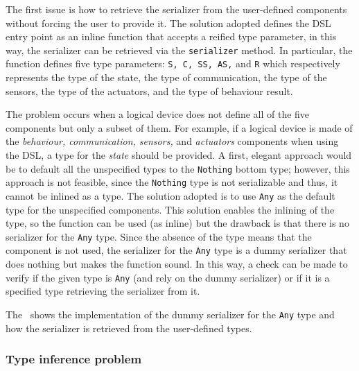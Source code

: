 The first issue is how to retrieve the serializer from the user-defined components without forcing the user to provide it. The solution adopted
defines the DSL entry point as an inline function that accepts a reified type parameter, in this way, the serializer can be retrieved via the
\texttt{serializer} method. In particular, the function defines five type parameters: \texttt{S, C, SS, AS,} and \texttt{R} which respectively
represents the type of the state, the type of communication, the type of the sensors, the type of the actuators, and the type of behaviour result.

The problem occurs when a logical device does not define all of the five components but only a subset of them.
For example, if a logical device is made of the \emph{behaviour, communication, sensors,} and \emph{actuators} components when using the DSL, a type
for the \emph{state} should be provided. A first, elegant approach would be to default all the unspecified types to the \texttt{Nothing} bottom type;
however, this approach is not feasible, since the \texttt{Nothing} type is not serializable and thus, it cannot be inlined as a type.
The solution adopted is to use \texttt{Any} as the default type for the unspecified components. This solution enables the inlining of the type,
so the function can be used (as inline) but the drawback is that there is no serializer for the \texttt{Any} type.
Since the absence of the type means that the component is not used, the serializer for the \texttt{Any} type is a dummy serializer that does
nothing but makes the function sound. In this way, a check can be made to verify if the given type is \texttt{Any} (and rely on the dummy serializer)
or if it is a specified type retrieving the serializer from it.

The~ shows the implementation of the dummy serializer for the \texttt{Any} type and how the serializer is retrieved from the
user-defined types.



\subsubsection{Type inference problem}

